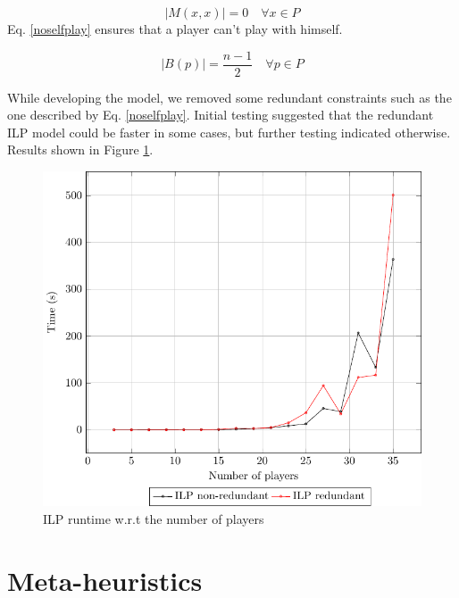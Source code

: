 \documentclass[a4paper, 10pt]{article}
\begin{document}
\begin{minipage}{0.45\linewidth}
\begin{equation}
    \label{noselfplay}
    |M(x,x)| = 0 \quad \forall x \in P 
\end{equation}
Eq. \ref{noselfplay} ensures that a player can't play with himself. 

\begin{equation}
    \label{blackfairness}
    |B(p)| = \frac{n-1}{2} \quad \forall p \in P
\end{equation}

    While developing the model, we removed some redundant constraints such as the one described by Eq. \ref{noselfplay}. Initial testing suggested that the redundant ILP model could be faster in some cases, but further testing indicated otherwise. Results shown in Figure \ref{figilp}.
\end{minipage}
\begin{minipage}{0.49\linewidth}
\begin{figure}[H]
    \centering
    \includegraphics[width=\linewidth]{plots/time_per_instance.pdf}
    \caption{ILP runtime w.r.t the number of players}
    \label{figilp}
\end{figure}
\end{minipage}


\clearpage

\section{Meta-heuristics}
\end{document}
